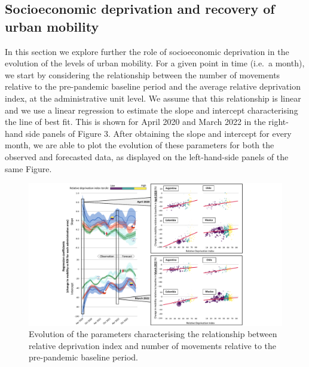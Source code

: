 \documentclass[
  11pt,
]{article}
\begin{document}
\hypertarget{socioeconomic-deprivation-and-recovery-of-urban-mobility}{%
\subsection{Socioeconomic deprivation and recovery of urban
mobility}\label{socioeconomic-deprivation-and-recovery-of-urban-mobility}}

In this section we explore further the role of socioeconomic deprivation
in the evolution of the levels of urban mobility. For a given point in
time (i.e.~a month), we start by considering the relationship between
the number of movements relative to the pre-pandemic baseline period and
the average relative deprivation index, at the administrative unit
level. We assume that this relationship is linear and we use a linear
regression to estimate the slope and intercept characterising the line
of best fit. This is shown for April 2020 and March 2022 in the
right-hand side panels of Figure 3. After obtaining the slope and
intercept for every month, we are able to plot the evolution of these
parameters for both the observed and forecasted data, as displayed on
the left-hand-side panels of the same Figure.

\begin{figure}

{\centering \includegraphics{figures/regression-evo-nobackground.pdf}

}

\caption{Evolution of the parameters characterising the relationship
between relative deprivation index and number of movements relative to
the pre-pandemic baseline period.}

\end{figure}
\end{document}
